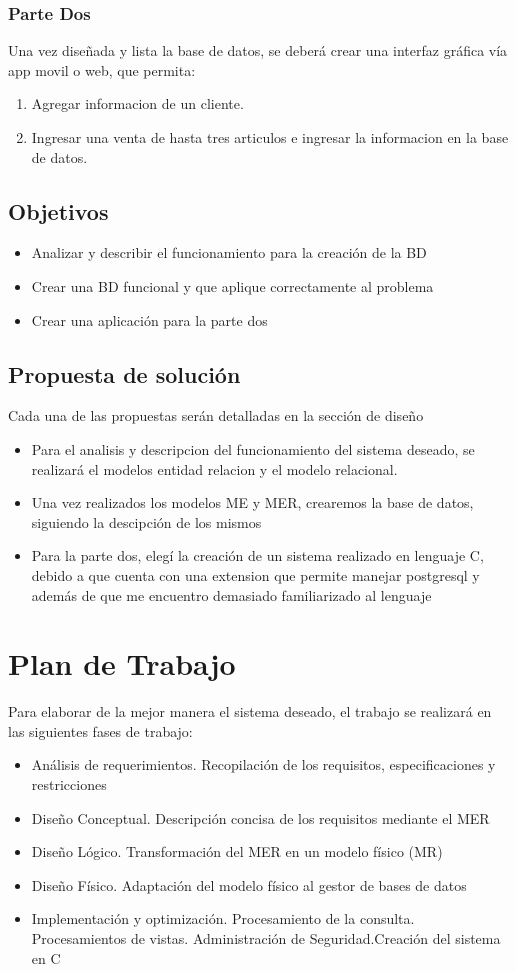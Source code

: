 \documentclass[letter,12pt]{article}
\begin{document}
\subsubsection{Parte Dos}
Una vez diseñada y lista la base de datos, se deber\'a crear una interfaz gráfica vía app movil o web, que permita:
\begin{enumerate}
\item Agregar informacion de un cliente.
\item Ingresar una venta de hasta tres articulos e ingresar la informacion en la base de datos.
\end{enumerate}
\newpage
\subsection{Objetivos}
\begin{itemize}
\item Analizar y describir el funcionamiento para la creación de la BD
\item Crear una BD funcional y que aplique correctamente al problema 
\item Crear una aplicación para la parte dos
\end{itemize}
\subsection{Propuesta de soluci\'on}
Cada una de las propuestas serán detalladas en la sección de diseño
\begin{itemize}
\item Para el analisis y descripcion del funcionamiento del sistema deseado, se realizará el modelos entidad relacion y el modelo relacional.
\item Una vez realizados los modelos ME y MER, crearemos la base de datos, siguiendo la descipción de los mismos
\item Para la parte dos, elegí la creación de un sistema realizado en lenguaje C, debido a que cuenta con una extension que permite manejar postgresql y además de que me encuentro demasiado familiarizado al lenguaje
\end{itemize}

\section{Plan de Trabajo}
Para elaborar de la mejor manera el sistema deseado, el trabajo se realizará en las siguientes fases de trabajo:
\begin{itemize}
\item Análisis de requerimientos. Recopilación de los requisitos, especificaciones y restricciones
\item Diseño Conceptual. Descripción concisa de los requisitos mediante el MER
\item Diseño Lógico. Transformación del MER en un modelo físico (MR)
\item Diseño Físico. Adaptación del modelo físico al gestor de bases de datos
\item Implementación y optimización. Procesamiento de la consulta. Procesamientos de vistas. Administración de Seguridad.Creación del sistema en C
\end{itemize}
\end{document}
